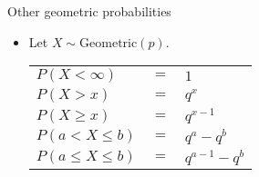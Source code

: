 \documentclass{article}
\begin{document}
Other geometric probabilities
\begin{itemize}
    \item Let $X \sim \text{Geometric}(p)$.\bigskip\\
    {\renewcommand{\arraystretch}{1.3}
    \begin{tabular}{l l l}
    $P(X < \infty)$ & $=$ & $1$ \\
    $P(X > x)$ & $=$ & $q^x$\\
    $P(X \ge x)$ & $=$ & $q^{x - 1}$\\
    $P(a < X \le b)$ & $=$ & $q^a - q^b$\\
    $P(a \le X \le b)$ & $=$ & $q^{a - 1} - q^b$
    \end{tabular}
    }
\end{itemize}\vspace{100pt}
\end{document}
